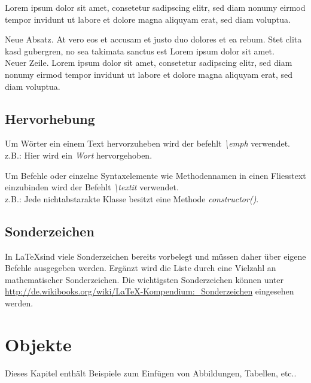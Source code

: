 \documentclass[12pt,a4paper, listof=entryprefix, bibliography=totocnumbered,toc=listofnumbered,lof=listofnumbered]{scrartcl}
\begin{document}
Lorem ipsum dolor sit amet, consetetur sadipscing elitr, sed diam nonumy eirmod tempor invidunt ut labore et dolore magna aliquyam erat, sed diam voluptua.

Neue Absatz. At vero eos et accusam et justo duo dolores et ea rebum. Stet clita kasd gubergren, no sea takimata sanctus est Lorem ipsum dolor sit amet. \\ %
Neuer Zeile. Lorem ipsum dolor sit amet, consetetur sadipscing elitr, sed diam nonumy eirmod tempor invidunt ut labore et dolore magna aliquyam erat, sed diam voluptua. 

\subsection{Hervorhebung}
\label{ch:hervorhebung}
Um Wörter ein einem Text hervorzuheben wird der befehlt \textit{\textbackslash emph} verwendet.
\\ z.B.: Hier wird ein \emph{Wort} hervorgehoben.

Um Befehle oder einzelne Syntaxelemente wie Methodennamen in einen Fliesstext einzubinden wird der Befehlt \textit{\textbackslash textit} verwendet. 
\\z.B.: Jede nichtabstarakte Klasse besitzt eine Methode \textit{constructor()}.

\subsection{Sonderzeichen}
\label{ch:zeichen}

In \LaTeX sind viele Sonderzeichen bereits vorbelegt und müssen daher über eigene Befehle ausgegeben werden. Ergänzt wird die Liste durch eine Vielzahl an mathematischer Sonderzeichen. Die wichtigsten Sonderzeichen können unter \url{http://de.wikibooks.org/wiki/LaTeX-Kompendium:_Sonderzeichen} eingesehen werden.





\section{Objekte}
\label{ch:objekte}
Dieses Kapitel enthält Beispiele zum Einfügen von Abbildungen, Tabellen, etc..
 
\end{document}
